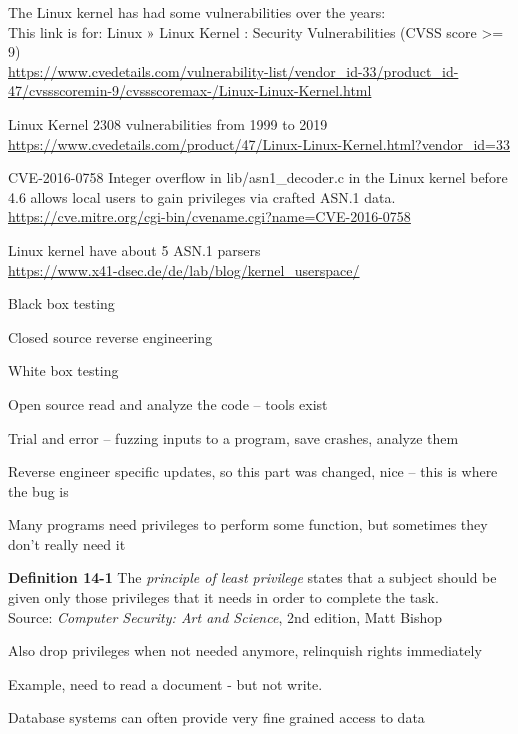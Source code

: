 \documentclass[Screen16to9,17pt]{foils}
\begin{document}

The Linux kernel has had some vulnerabilities over the years:\\
This link is for: Linux » Linux Kernel : Security Vulnerabilities (CVSS score >= 9)\\

{\footnotesize\url{https://www.cvedetails.com/vulnerability-list/vendor_id-33/product_id-47/cvssscoremin-9/cvssscoremax-/Linux-Linux-Kernel.html}}

Linux Kernel 2308 vulnerabilities from 1999 to 2019\\
\url{https://www.cvedetails.com/product/47/Linux-Linux-Kernel.html?vendor_id=33}


\begin{list2}
\item CVE-2016-0758 Integer overflow in lib/asn1\_decoder.c in the Linux kernel before 4.6 allows local users to gain privileges via crafted ASN.1 data.\\
\url{https://cve.mitre.org/cgi-bin/cvename.cgi?name=CVE-2016-0758}
\item Linux kernel have about 5 ASN.1 parsers\\
\url{https://www.x41-dsec.de/de/lab/blog/kernel_userspace/}
\end{list2}




\begin{list1}
\item Black box testing
\item Closed source reverse engineering
\item White box testing
\item Open source read and analyze the code -- tools exist
\item Trial and error -- fuzzing inputs to a program, save crashes, analyze them
\item Reverse engineer specific updates, so this part was changed, nice -- this is where the bug is
\end{list1}



\begin{list1}
\item Many programs need privileges to perform some function, but sometimes they don't really need it
\item {\bf Definition 14-1} The \emph{principle of least privilege} states that a subject should be given only those privileges that it needs in order to complete the task.\\
Source:  \emph{Computer Security: Art and Science}, 2nd edition, Matt Bishop

\item Also drop privileges when not needed anymore, relinquish rights immediately
\item Example, need to read a document - but not write.
\item Database systems can often provide very fine grained access to data
\end{list1}
\end{document}

